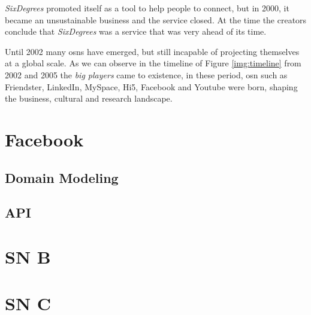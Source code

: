 \textit{SixDegrees} promoted itself as a tool to help people to connect, but in 2000, it became an
unsustainable business and the service closed. At the time the creators conclude that
\textit{SixDegrees} was a service that was very ahead of its time.

Until 2002 many \glspl{osn} have emerged, but still incapable of projecting themselves at a global scale.
As we can observe in the timeline of Figure \ref{img:timeline} from 2002 and 2005 the \textit{big players} came to existence, in these period, \gls{osn}
such as Friendster, LinkedIn, MySpace, Hi5, Facebook and Youtube were born, shaping the business, cultural
and research landscape.

\section{Facebook}
\subsection{Domain Modeling}
\subsection{API}
\section{SN B}
\section{SN C}

